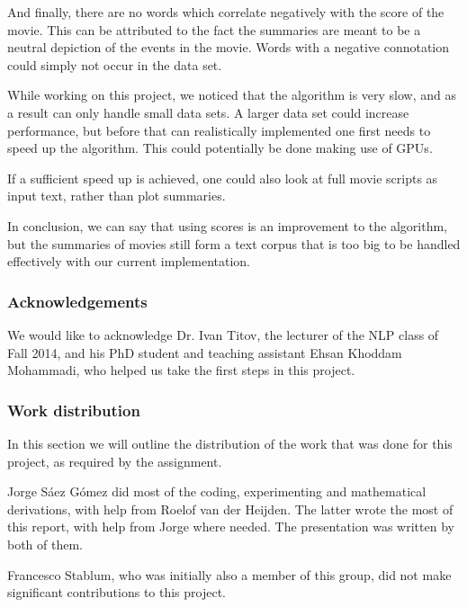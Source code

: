 \documentclass{article} %
\begin{document}
And finally, there are no words which correlate negatively with the score of the movie. 
This can be attributed to the fact the summaries are meant to be a neutral depiction of the events in the movie.
Words with a negative connotation could simply not occur in the data set.

While working on this project, we noticed that the algorithm is very slow, and as a result can only handle small data sets.
A larger data set could increase performance, but before that can realistically implemented one first needs to speed up the algorithm. This could potentially be done making use of GPUs.

If a sufficient speed up is achieved, one could also look at full movie scripts as input text, rather than plot summaries. 

In conclusion, we can say that using scores is an improvement to the algorithm, but the summaries of movies still form a text corpus that is too big to be handled effectively with our current implementation.

\subsubsection*{Acknowledgements}

We would like to acknowledge Dr. Ivan Titov, the lecturer of the NLP class of Fall 2014, and his PhD student and teaching assistant Ehsan Khoddam Mohammadi, who helped us take the first steps in this project.

\subsubsection*{Work distribution}
In this section we will outline the distribution of the work that was done for this project, as required by the assignment.

Jorge S\'{a}ez G\'{o}mez did most of the coding, experimenting and mathematical derivations, with help from Roelof van der Heijden.
The latter wrote the most of this report, with help from Jorge where needed.
The presentation was written by both of them.

Francesco Stablum, who was initially also a member of this group, did not make significant contributions to this project.
\end{document}

